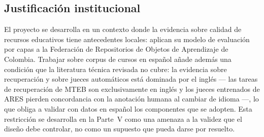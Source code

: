 \subsection{Justificación institucional}
\label{sec:just-institucional}

El proyecto se desarrolla en un contexto donde la evidencia sobre calidad de recursos
educativos tiene antecedentes locales: \textcite{tabares2017modelo} aplican su modelo
de evaluación por capas a la Federación de Repositorios de Objetos de Aprendizaje de
Colombia. Trabajar sobre corpus de cursos en español añade además una condición que
la literatura técnica revisada no cubre: la evidencia sobre recuperación y sobre
jueces automáticos está dominada por el inglés --- las tareas de recuperación de
MTEB son exclusivamente en inglés \parencite{muennighoff2023mteb} y los jueces
entrenados de ARES pierden concordancia con la anotación humana al cambiar de idioma
\parencite{saadfalcon2024ares} ---, lo que obliga a validar con datos en español los
componentes que se adopten. Esta restricción se desarrolla en la
Parte~V como una amenaza a la validez que el diseño debe controlar, no como un
supuesto que pueda darse por resuelto.
